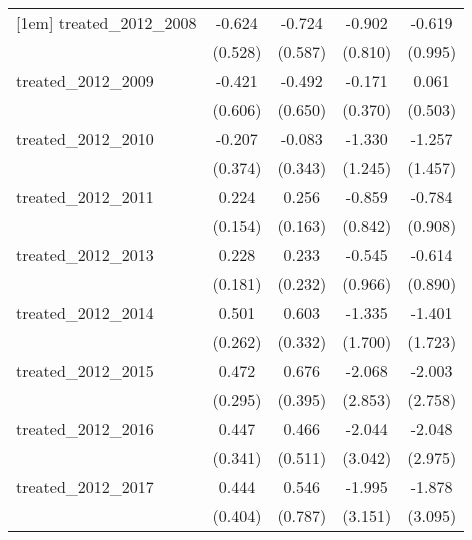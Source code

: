 {\begin{tabular}{l*{4}{c}}
[1em]
treated\_2012\_2008&      -0.624         &      -0.724         &      -0.902         &      -0.619         \\
            &     (0.528)         &     (0.587)         &     (0.810)         &     (0.995)         \\
[1em]
treated\_2012\_2009&      -0.421         &      -0.492         &      -0.171         &       0.061         \\
            &     (0.606)         &     (0.650)         &     (0.370)         &     (0.503)         \\
[1em]
treated\_2012\_2010&      -0.207         &      -0.083         &      -1.330         &      -1.257         \\
            &     (0.374)         &     (0.343)         &     (1.245)         &     (1.457)         \\
[1em]
treated\_2012\_2011&       0.224         &       0.256         &      -0.859         &      -0.784         \\
            &     (0.154)         &     (0.163)         &     (0.842)         &     (0.908)         \\
[1em]
treated\_2012\_2013&       0.228         &       0.233         &      -0.545         &      -0.614         \\
            &     (0.181)         &     (0.232)         &     (0.966)         &     (0.890)         \\
[1em]
treated\_2012\_2014&       0.501         &       0.603         &      -1.335         &      -1.401         \\
            &     (0.262)         &     (0.332)         &     (1.700)         &     (1.723)         \\
[1em]
treated\_2012\_2015&       0.472         &       0.676         &      -2.068         &      -2.003         \\
            &     (0.295)         &     (0.395)         &     (2.853)         &     (2.758)         \\
[1em]
treated\_2012\_2016&       0.447         &       0.466         &      -2.044         &      -2.048         \\
            &     (0.341)         &     (0.511)         &     (3.042)         &     (2.975)         \\
[1em]
treated\_2012\_2017&       0.444         &       0.546         &      -1.995         &      -1.878         \\
            &     (0.404)         &     (0.787)         &     (3.151)         &     (3.095)         \\

\end{tabular}}
